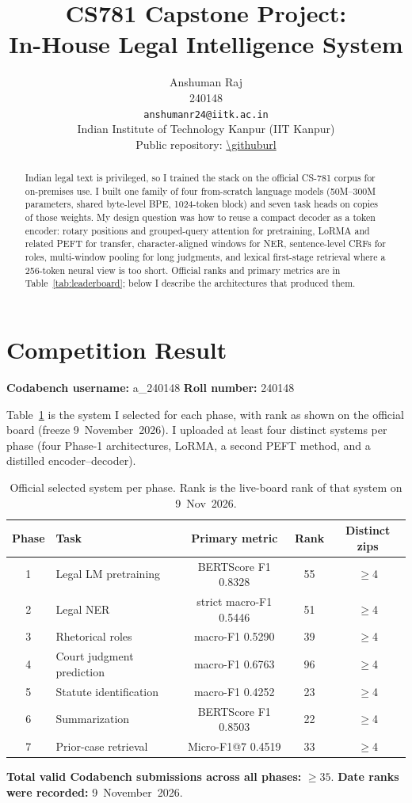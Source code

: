 \documentclass[11pt, oneside]{article}
\title{CS781 Capstone Project:\\
In-House Legal Intelligence System}
\author{
    Anshuman Raj  \\
    240148 \\
    {\tt anshumanr24@iitk.ac.in}\\
    Indian Institute of Technology Kanpur (IIT Kanpur)\\[0.4em]
    {\small Public repository: \url{\githuburl}}
}
\date{}
\begin{document}
\maketitle
\begin{abstract}
Indian legal text is privileged, so I trained the stack on the official CS-781 corpus for on-premises use. I built one family of four from-scratch language models (50M--300M parameters, shared byte-level BPE, 1024-token block) and seven task heads on copies of those weights. My design question was how to reuse a compact decoder as a token encoder: rotary positions and grouped-query attention for pretraining, LoRMA and related PEFT for transfer, character-aligned windows for NER, sentence-level CRFs for roles, multi-window pooling for long judgments, and lexical first-stage retrieval where a 256-token neural view is too short. Official ranks and primary metrics are in Table~\ref{tab:leaderboard}; below I describe the architectures that produced them.
\end{abstract}

\section{Competition Result}
\noindent
\textbf{Codabench username:} a\_240148
\hfill
\textbf{Roll number:} 240148
\medskip

\noindent
Table~\ref{tab:leaderboard} is the system I selected for each phase, with rank as shown on the official board (freeze 9~November~2026). I uploaded at least four distinct systems per phase (four Phase-1 architectures, LoRMA, a second PEFT method, and a distilled encoder--decoder).

\begin{table}[H]
\centering
\small
\caption{Official selected system per phase. Rank is the live-board rank of that system on 9~Nov~2026.}
\label{tab:leaderboard}
\begin{tabular}{clccc}
\toprule
Phase & Task & Primary metric & Rank & Distinct zips \\
\midrule
1 & Legal LM pretraining & BERTScore F1 0.8328 & 55 & $\ge$4 \\
2 & Legal NER & strict macro-F1 0.5446 & 51 & $\ge$4 \\
3 & Rhetorical roles & macro-F1 0.5290 & 39 & $\ge$4 \\
4 & Court judgment prediction & macro-F1 0.6763 & 96 & $\ge$4 \\
5 & Statute identification & macro-F1 0.4252 & 23 & $\ge$4 \\
6 & Summarization & BERTScore F1 0.8503 & 22 & $\ge$4 \\
7 & Prior-case retrieval & Micro-F1@7 0.4519 & 33 & $\ge$4 \\
\bottomrule
\end{tabular}
\end{table}
\noindent
\textbf{Total valid Codabench submissions across all phases:} $\ge 35$.
\quad
\textbf{Date ranks were recorded:} 9~November~2026.
\end{document}
